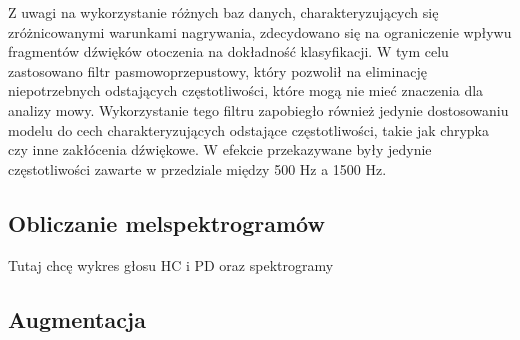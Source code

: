 Z uwagi na wykorzystanie różnych baz danych, charakteryzujących się zróżnicowanymi warunkami nagrywania, zdecydowano się na ograniczenie wpływu fragmentów dźwięków otoczenia na dokładność klasyfikacji.
W tym celu zastosowano filtr pasmowoprzepustowy, który pozwolił na eliminację niepotrzebnych odstających częstotliwości, które mogą nie mieć znaczenia dla analizy mowy.
Wykorzystanie tego filtru zapobiegło również jedynie dostosowaniu modelu do cech charakteryzujących odstające częstotliwości, takie jak chrypka czy inne zakłócenia dźwiękowe.
W efekcie przekazywane były jedynie częstotliwości zawarte w przedziale między 500 Hz a 1500 Hz.


\subsection{Obliczanie melspektrogramów}
\label{subsec:melspectrogram}


Tutaj chcę wykres głosu HC i PD oraz spektrogramy




\subsection{Augmentacja}
\label{subsec:augmentacja}

